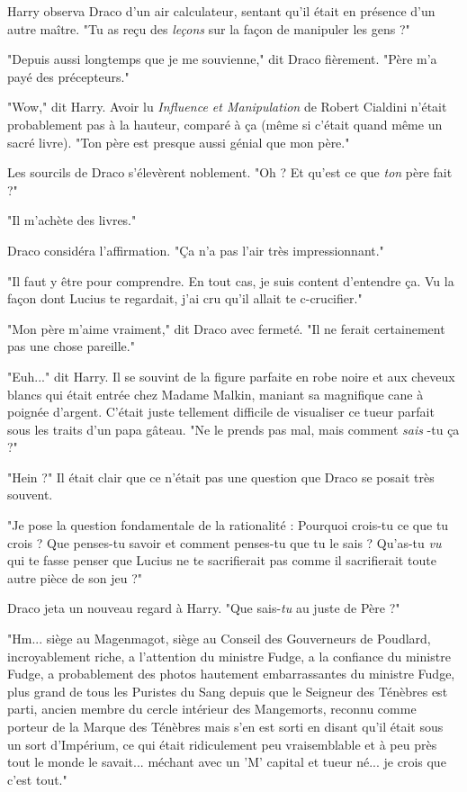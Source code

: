 Harry observa Draco d'un air calculateur, sentant qu'il était en présence d'un autre maître. "Tu as reçu des \emph{leçons}  sur la façon de manipuler les gens ?"

"Depuis aussi longtemps que je me souvienne," dit Draco fièrement. "Père m'a payé des précepteurs."

"Wow," dit Harry. Avoir lu \emph{Influence et Manipulation}  de Robert Cialdini n'était probablement pas à la hauteur, comparé à ça (même si c'était quand même un sacré livre). "Ton père est presque aussi génial que mon père."

Les sourcils de Draco s'élevèrent noblement. "Oh ? Et qu'est ce que \emph{ton}  père fait ?"

"Il m'achète des livres."

Draco considéra l'affirmation. "Ça n'a pas l'air très impressionnant."

"Il faut y être pour comprendre. En tout cas, je suis content d'entendre ça. Vu la façon dont Lucius te regardait, j'ai cru qu'il allait te c-crucifier."

"Mon père m'aime vraiment," dit Draco avec fermeté. "Il ne ferait certainement pas une chose pareille."

"Euh..." dit Harry. Il se souvint de la figure parfaite en robe noire et aux cheveux blancs qui était entrée chez Madame Malkin, maniant sa magnifique cane à poignée d'argent. C'était juste tellement difficile de visualiser ce tueur parfait sous les traits d'un papa gâteau. "Ne le prends pas mal, mais comment \emph{sais} -tu ça ?"

"Hein ?" Il était clair que ce n'était pas une question que Draco se posait très souvent.

"Je pose la question fondamentale de la rationalité : Pourquoi crois-tu ce que tu crois ? Que penses-tu savoir et comment penses-tu que tu le sais ? Qu'as-tu \emph{vu}  qui te fasse penser que Lucius ne te sacrifierait pas comme il sacrifierait toute autre pièce de son jeu ?"

Draco jeta un nouveau regard à Harry. "Que sais-\emph{tu}  au juste de Père ?"

"Hm... siège au Magenmagot, siège au Conseil des Gouverneurs de Poudlard, incroyablement riche, a l'attention du ministre Fudge, a la confiance du ministre Fudge, a probablement des photos hautement embarrassantes du ministre Fudge, plus grand de tous les Puristes du Sang depuis que le Seigneur des Ténèbres est parti, ancien membre du cercle intérieur des Mangemorts, reconnu comme porteur de la Marque des Ténèbres mais s'en est sorti en disant qu'il était sous un sort d'Impérium, ce qui était ridiculement peu vraisemblable et à peu près tout le monde le savait... méchant avec un 'M' capital et tueur né... je crois que c'est tout."

